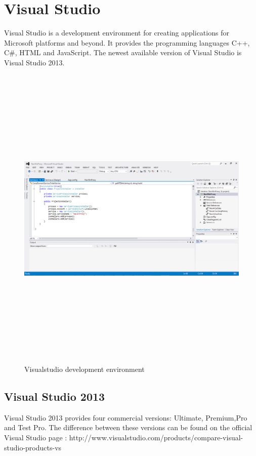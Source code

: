 \section{Visual Studio}
Visual Studio is a development environment for creating applications for Microsoft platforms and beyond. It provides the programming languages C++, C\#, HTML and JavaScript.
The newest available version of Visual Studio is Visual Studio 2013.\cite{vstudio1}

\begin{figure}[htbp]
\centering
\includegraphics[width=140mm,height=150mm,keepaspectratio]{graphics/visualstudio.png}
\caption{Visualstudio development environment\cite{ajax}}
\end{figure}


\subsection{Visual Studio 2013}
Visual Studio 2013 provides four commercial versions: Ultimate, Premium,Pro and Test Pro. The difference between these versions can be found on the official Visual Studio page : http://www.visualstudio.com/products/compare-visual-
\\
studio-products-vs
\newpage
